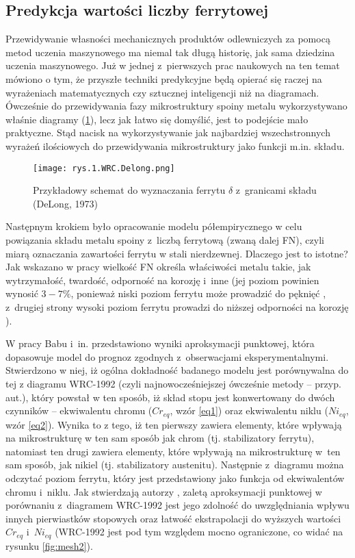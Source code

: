 \subsection{Predykcja wartości liczby ferrytowej}
\label{sec:liczba.ferrytowa}

Przewidywanie własności mechanicznych produktów odlewniczych za pomocą metod uczenia maszynowego ma niemal tak długą historię, jak sama dziedzina uczenia maszynowego. Już w jednej z~pierwszych prac naukowych na ten temat \cite{Olson85} mówiono o tym, że przyszłe techniki predykcyjne będą opierać się raczej na wyrażeniach matematycznych czy sztucznej inteligencji niż na diagramach. 
Ówcześnie do przewidywania fazy mikrostruktury spoiny metalu wykorzystywano właśnie diagramy (\ref{fig:mesh1}), lecz jak łatwo się domyślić, jest to podejście mało praktyczne. Stąd nacisk na wykorzystywanie jak najbardziej wszechstronnych wyrażeń ilościowych do przewidywania mikrostruktury jako funkcji m.in. składu.

\begin{figure}[h]
    \centering
    \texttt{[image: rys.1.WRC.Delong.png]}
    \caption{Przykładowy schemat do wyznaczania ferrytu $ \delta $ z~granicami składu (DeLong, 1973)}
    \label{fig:mesh1}
\end{figure}

Następnym krokiem było opracowanie modelu półempirycznego w celu powiązania składu metalu spoiny z~liczbą ferrytową (zwaną dalej FN), czyli miarą oznaczania zawartości ferrytu w stali nierdzewnej. Dlaczego jest to istotne? Jak wskazano w pracy \cite{Vitek03.I} wielkość FN określa właściwości metalu takie, jak wytrzymałość, twardość, odporność na korozję i~inne (jej poziom powinien wynosić $3-7\%$, ponieważ niski poziom ferrytu może prowadzić do pęknięć \cite{ferrite.meter, Saluja15}, z~drugiej strony wysoki poziom ferrytu prowadzi do niższej odporności na korozję \cite{Saluja15}). 

W pracy Babu i~in. \cite{Babu13} przedstawiono wyniki aproksymacji punktowej, która dopasowuje model do prognoz zgodnych z~obserwacjami eksperymentalnymi. Stwierdzono w niej, iż ogólna dokładność badanego modelu jest porównywalna do tej z diagramu WRC-1992 (czyli najnowocześniejszej ówcześnie metody – przyp. aut.), który powstał w ten sposób, iż skład stopu jest konwertowany do dwóch czynników – ekwiwalentu chromu ($Cr_{eq}$, wzór \ref{eq1}) oraz ekwiwalentu niklu ($Ni_{eq}$, wzór \ref{eq2}). Wynika to z tego, iż ten pierwszy zawiera elementy, które wpływają na mikrostrukturę w ten sam sposób jak chrom (tj. stabilizatory ferrytu), natomiast ten drugi zawiera elementy, które wpływają na mikrostrukturę w~ten sam sposób, jak nikiel (tj. stabilizatory austenitu). Następnie z~diagramu można odczytać poziom ferrytu, który jest przedstawiony jako funkcja od ekwiwalentów chromu i~niklu. Jak stwierdzają autorzy \cite{Babu13}, zaletą aproksymacji punktowej w porównaniu z~diagramem WRC-1992 jest jego zdolność do uwzględniania wpływu innych pierwiastków stopowych oraz łatwość ekstrapolacji do wyższych wartości $Cr_{eq}$ i~$Ni_{eq}$ (WRC-1992 jest pod tym względem mocno ograniczone, co widać na rysunku \ref{fig:mesh2}).

